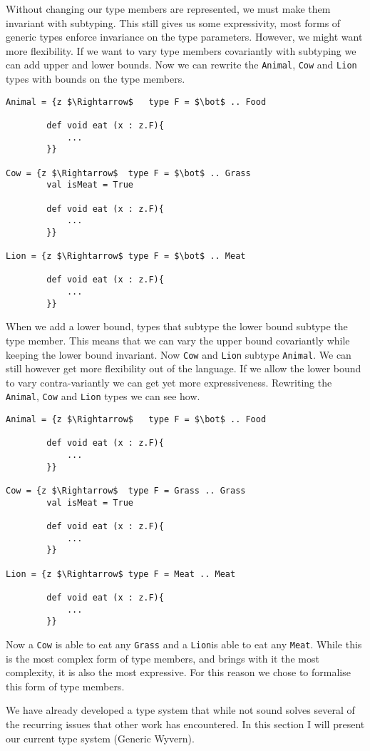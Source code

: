 \documentclass[11pt
              , a4paper
              , twoside
              , openright
              ]{report}
\numberwithin{case}{theorem}
\numberwithin{subcase}{case}
\begin{document}
Without changing our type members are represented, we must make them invariant with subtyping. This still gives us some expressivity, most forms of generic types enforce invariance on the type parameters. However, we might want more flexibility.
If we want to vary type members covariantly with subtyping we can add upper and lower bounds. Now we can rewrite the \verb|Animal|, \verb|Cow| and \verb|Lion| types with bounds on the type members.
\begin{lstlisting}[mathescape, style=custom_lang]
Animal = {z $\Rightarrow$	type F = $\bot$ .. Food
		
		def void eat (x : z.F){
			...
		}}
		
Cow = {z $\Rightarrow$	type F = $\bot$ .. Grass
		val isMeat = True
		
		def void eat (x : z.F){
			...
		}}

Lion = {z $\Rightarrow$	type F = $\bot$ .. Meat
		
		def void eat (x : z.F){
			...
		}}
\end{lstlisting}
When we add a lower bound, types that subtype the lower bound subtype the type member. This means that we can vary the upper bound covariantly while keeping the lower bound invariant. Now \verb|Cow| and \verb|Lion| subtype \verb|Animal|. We can still however get more flexibility out of the language. If we allow the lower bound to vary contra-variantly we can get yet more expressiveness. Rewriting the  \verb|Animal|, \verb|Cow| and \verb|Lion| types we can see how.
\begin{lstlisting}[mathescape, style=custom_lang]
Animal = {z $\Rightarrow$	type F = $\bot$ .. Food
		
		def void eat (x : z.F){
			...
		}}
		
Cow = {z $\Rightarrow$	type F = Grass .. Grass
		val isMeat = True
		
		def void eat (x : z.F){
			...
		}}

Lion = {z $\Rightarrow$	type F = Meat .. Meat
		
		def void eat (x : z.F){
			...
		}}
\end{lstlisting}
Now a \verb|Cow| is able to eat any \verb|Grass| and a \verb|Lion|is able to eat any \verb|Meat|. While this is the most complex form of type members, and brings with it the most complexity, it is also the most expressive. For this reason we chose to formalise this form of type members.

We have already developed a type system that while not sound solves several of the recurring issues that other work has encountered. In this section I will present our current type system (Generic Wyvern).
\end{document}
